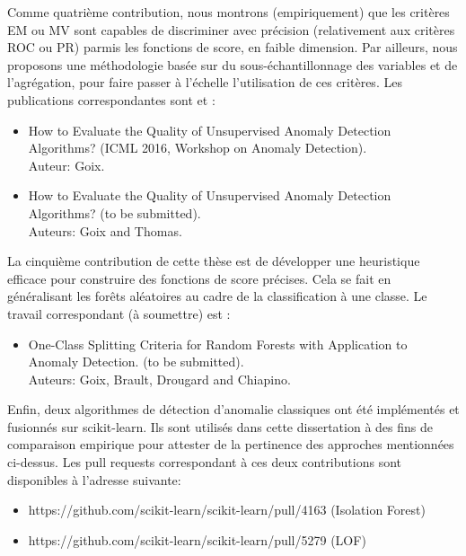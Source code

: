 \documentclass[a4paper, 12pt]{article}
\begin{document}
Comme quatrième contribution, nous montrons (empiriquement) que les critères EM ou MV sont capables de discriminer avec précision (relativement aux critères ROC ou PR) parmis les fonctions de score, en faible dimension. Par ailleurs, nous proposons une méthodologie basée sur du sous-échantillonnage des variables et de l'agrégation,  pour faire passer à l'échelle l'utilisation de ces critères.
Les publications correspondantes sont \cite{ICMLworkshop16} et \cite{NIPS16evaluation}:
\begin{itemize}
\item How to Evaluate the Quality of Unsupervised Anomaly Detection Algorithms? (ICML 2016, Workshop on Anomaly Detection). %
  \\
Auteur: Goix. 
\item How to Evaluate the Quality of Unsupervised Anomaly Detection Algorithms? (to be submitted).\\ Auteurs: Goix and Thomas. 
\end{itemize}


La cinquième contribution de cette thèse est de développer une heuristique efficace pour construire des fonctions de score précises. Cela se fait en généralisant les forêts aléatoires au cadre de la classification à une classe. Le travail correspondant (à soumettre) est \cite{OCRF16}:
%
\begin{itemize}
\item One-Class Splitting Criteria for Random Forests with Application to Anomaly Detection. (to be submitted).\\
Auteurs: Goix, Brault, Drougard and Chiapino.
\end{itemize}


Enfin, deux algorithmes de détection d'anomalie classiques ont été implémentés et fusionnés sur scikit-learn. Ils sont utilisés dans cette dissertation à des fins de comparaison empirique pour attester de la pertinence des approches mentionnées ci-dessus.
Les pull requests correspondant à ces deux contributions sont disponibles à l'adresse suivante:
%
\begin{itemize}
\item https://github.com/scikit-learn/scikit-learn/pull/4163  (Isolation Forest)
\item https://github.com/scikit-learn/scikit-learn/pull/5279 (LOF)
\end{itemize}
\end{document}
